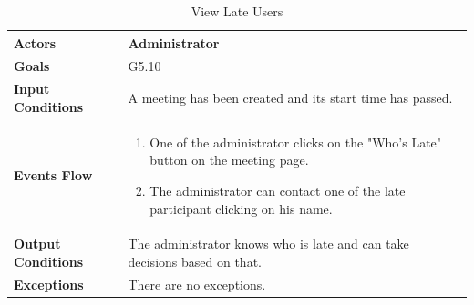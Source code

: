 \begin{table}[H]
	\centering
	\def\arraystretch{1.5}
	\begin{tabular}{|p{7cm}|p{7cm}|}
		\hline
		\textbf{Actors}            & Administrator    \\ \hline
		\textbf{Goals}             & G5.10           \\ \hline
		\textbf{Input Conditions}  & A meeting has been created and its start time has passed.         \\ \hline
		\textbf{Events Flow}       &  
		\begin{enumerate}[topsep=0pt, leftmargin=*]
			\item One of the administrator clicks on the "Who's Late" button on the meeting page.
			\item The administrator can contact one of the late participant clicking on his name.
		\end{enumerate}             \\ \hline
		\textbf{Output Conditions} & The administrator knows who is late and can take decisions based on that.           \\ \hline
		\textbf{Exceptions}        & There are no exceptions.           \\ \hline
	\end{tabular}
	\caption{View Late Users}
\end{table}

